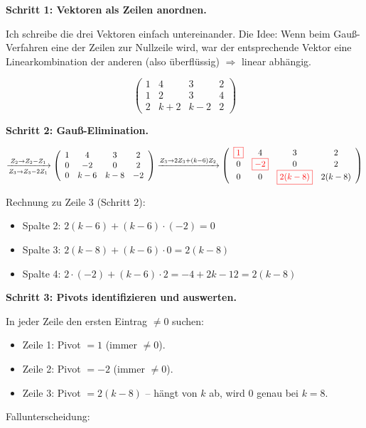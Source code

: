 \documentclass[a4paper,12pt]{article}
\newcommand{\piv}[1]{{\color{red}\boxed{#1}}}
\begin{document}
\textbf{Schritt 1: Vektoren als Zeilen anordnen.}

Ich schreibe die drei Vektoren einfach untereinander. Die Idee: Wenn beim Gau\ss-Verfahren
eine der Zeilen zur Nullzeile wird, war der entsprechende Vektor eine Linearkombination
der anderen (also \"uberfl\"ussig) $\Rightarrow$ linear abh\"angig.

\[
\left(\begin{array}{cccc}
1 & 4 & 3 & 2 \\
1 & 2 & 3 & 4 \\
2 & k+2 & k-2 & 2
\end{array}\right)
\]

\textbf{Schritt 2: Gau\ss-Elimination.}

\[
\xrightarrow[Z_3 \to Z_3 - 2Z_1]{Z_2 \to Z_2 - Z_1}
\left(\begin{array}{cccc}
1 & 4 & 3 & 2 \\
0 & -2 & 0 & 2 \\
0 & k-6 & k-8 & -2
\end{array}\right)
\xrightarrow{Z_3 \to 2Z_3 + (k-6)Z_2}
\left(\begin{array}{cccc}
\piv{1} & 4 & 3 & 2 \\
0 & \piv{-2} & 0 & 2 \\
0 & 0 & \piv{2(k-8)} & 2(k-8)
\end{array}\right)
\]

Rechnung zu Zeile 3 (Schritt 2):
\begin{itemize}[nosep, leftmargin=*]
\item Spalte 2: $2(k-6) + (k-6) \cdot (-2) = 0$
\item Spalte 3: $2(k-8) + (k-6) \cdot 0 = 2(k-8)$
\item Spalte 4: $2 \cdot (-2) + (k-6) \cdot 2 = -4 + 2k - 12 = 2(k-8)$
\end{itemize}

\textbf{Schritt 3: Pivots identifizieren und auswerten.}

In jeder Zeile den ersten Eintrag $\neq 0$ suchen:
\begin{itemize}[leftmargin=*, nosep]
\item Zeile 1: Pivot $= 1$ (immer $\neq 0$). \checkmark
\item Zeile 2: Pivot $= -2$ (immer $\neq 0$). \checkmark
\item Zeile 3: Pivot $= 2(k-8)$ -- h\"angt von $k$ ab, wird $0$ genau bei $k = 8$.
\end{itemize}

Fallunterscheidung:
\end{document}

